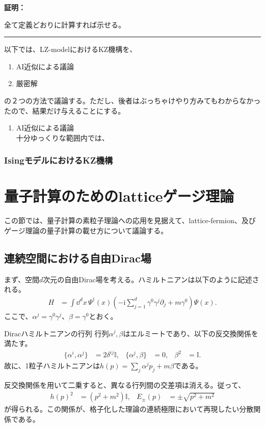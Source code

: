 \documentclass[a4paper,10.5pt]{article}
\numberwithin{equation}{section}
\providecommand{\ii}{\mathrm{i}}
\providecommand{\id}{\mathbb{I}}
\newenvironment{proofbox}
{\begin{prooflabel}\textbf{証明：}\end{prooflabel}\vspace{0.8em}}
{\par\vspace{1em}\hrule\vspace{1em}}
\begin{document}
\begin{proofbox}
    全て定義どおりに計算すれば示せる。
\end{proofbox}
以下では、LZ-modelにおけるKZ機構を、
\begin{enumerate}
    \item AI近似による議論
    \item 厳密解
\end{enumerate}
の２つの方法で議論する。ただし、後者はぶっちゃけやり方みてもわからなかったので、結果だけ与えることにする。
\begin{enumerate}
    \item AI近似による議論\\
    十分ゆっくりな範囲内では、
\end{enumerate}
\subsubsection{IsingモデルにおけるKZ機構}

\section{量子計算のためのlatticeゲージ理論}
この節では、量子計算の素粒子理論への応用を見据えて、lattice-fermion、及びゲージ理論の量子計算の載せ方について議論する。
\subsection{連続空間における自由Dirac場}
まず、空間$d$次元の自由Dirac場を考える。ハミルトニアンは以下のように記述される。
\begin{align}
H&=\int \dd^d x\,\Psi^\dagger(x)
 \left(-\ii\sum_{j=1}^d\gamma^0\gamma^j\partial_j+m\gamma^0\right)\Psi(x).
\end{align}
ここで、$\alpha^j=\gamma^0\gamma^j$、$\beta=\gamma^0$とおく。
\begin{defbox}{Diracハミルトニアンの行列}
行列$\alpha^j,\beta$はエルミートであり、以下の反交換関係を満たす。
\begin{align}
\{\alpha^i,\alpha^j\}&=2\delta^{ij}\id,&
\{\alpha^j,\beta\}&=0,&\beta^2&=\id.
\end{align}
故に、1粒子ハミルトニアンは$h(p)=\sum_j\alpha^j p_j+m\beta$である。
\end{defbox}
反交換関係を用いて二乗すると、異なる行列間の交差項は消える。従って、
\begin{align}
h(p)^2&=(p^2+m^2)\id,&
E_\pm(p)&=\pm\sqrt{p^2+m^2}
\end{align}
が得られる。この関係が、格子化した理論の連続極限において再現したい分散関係である。
\end{document}

